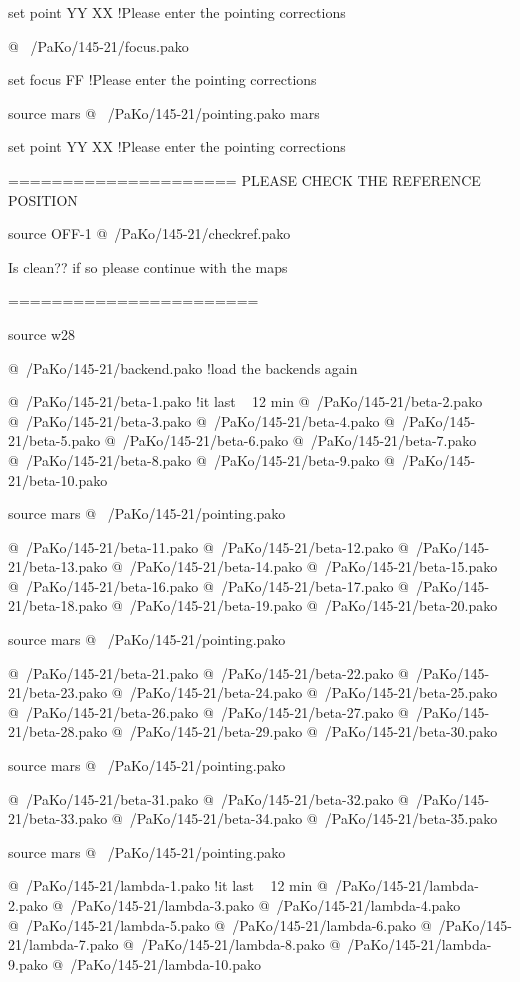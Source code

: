 set point  YY XX     !Please enter the pointing corrections

@ ~/PaKo/145-21/focus.pako

set focus FF         !Please enter the pointing corrections


source mars
@ ~/PaKo/145-21/pointing.pako mars
      
set point  YY XX     !Please enter the pointing corrections



=====================
PLEASE CHECK THE REFERENCE POSITION


source OFF-1
@~/PaKo/145-21/checkref.pako

Is clean?? if so please continue with the maps

=======================


source w28

@~/PaKo/145-21/backend.pako     !load the backends again 

@~/PaKo/145-21/beta-1.pako        !it last ~ 12 min 
@~/PaKo/145-21/beta-2.pako   
@~/PaKo/145-21/beta-3.pako
@~/PaKo/145-21/beta-4.pako
@~/PaKo/145-21/beta-5.pako
@~/PaKo/145-21/beta-6.pako
@~/PaKo/145-21/beta-7.pako
@~/PaKo/145-21/beta-8.pako
@~/PaKo/145-21/beta-9.pako
@~/PaKo/145-21/beta-10.pako

source mars
@ ~/PaKo/145-21/pointing.pako 

@~/PaKo/145-21/beta-11.pako
@~/PaKo/145-21/beta-12.pako
@~/PaKo/145-21/beta-13.pako
@~/PaKo/145-21/beta-14.pako
@~/PaKo/145-21/beta-15.pako
@~/PaKo/145-21/beta-16.pako
@~/PaKo/145-21/beta-17.pako
@~/PaKo/145-21/beta-18.pako
@~/PaKo/145-21/beta-19.pako
@~/PaKo/145-21/beta-20.pako

source mars
@ ~/PaKo/145-21/pointing.pako

@~/PaKo/145-21/beta-21.pako
@~/PaKo/145-21/beta-22.pako
@~/PaKo/145-21/beta-23.pako
@~/PaKo/145-21/beta-24.pako
@~/PaKo/145-21/beta-25.pako
@~/PaKo/145-21/beta-26.pako
@~/PaKo/145-21/beta-27.pako
@~/PaKo/145-21/beta-28.pako
@~/PaKo/145-21/beta-29.pako
@~/PaKo/145-21/beta-30.pako

source mars
@ ~/PaKo/145-21/pointing.pako

@~/PaKo/145-21/beta-31.pako
@~/PaKo/145-21/beta-32.pako
@~/PaKo/145-21/beta-33.pako
@~/PaKo/145-21/beta-34.pako
@~/PaKo/145-21/beta-35.pako

source mars
@ ~/PaKo/145-21/pointing.pako

@~/PaKo/145-21/lambda-1.pako        !it last ~ 12 min 
@~/PaKo/145-21/lambda-2.pako   
@~/PaKo/145-21/lambda-3.pako
@~/PaKo/145-21/lambda-4.pako
@~/PaKo/145-21/lambda-5.pako
@~/PaKo/145-21/lambda-6.pako
@~/PaKo/145-21/lambda-7.pako
@~/PaKo/145-21/lambda-8.pako
@~/PaKo/145-21/lambda-9.pako
@~/PaKo/145-21/lambda-10.pako

